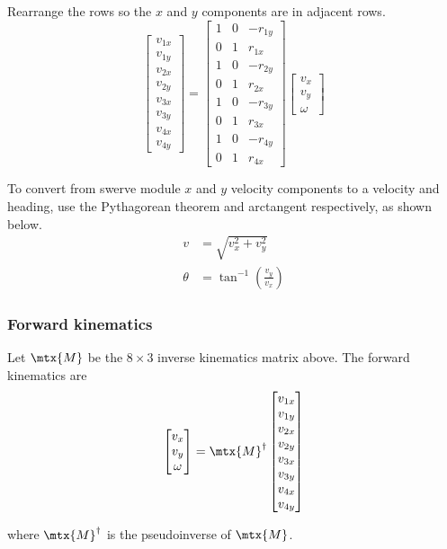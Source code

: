 Rearrange the rows so the $x$ and $y$ components are in adjacent rows.
\begin{equation}
  \begin{bmatrix}
    v_{1x} \\
    v_{1y} \\
    v_{2x} \\
    v_{2y} \\
    v_{3x} \\
    v_{3y} \\
    v_{4x} \\
    v_{4y}
  \end{bmatrix} =
  \begin{bmatrix}
    1 & 0 & -r_{1y} \\
    0 & 1 &  r_{1x} \\
    1 & 0 & -r_{2y} \\
    0 & 1 &  r_{2x} \\
    1 & 0 & -r_{3y} \\
    0 & 1 &  r_{3x} \\
    1 & 0 & -r_{4y} \\
    0 & 1 &  r_{4x}
  \end{bmatrix}
  \begin{bmatrix}
    v_x \\
    v_y \\
    \omega
  \end{bmatrix}
\end{equation}

To convert from swerve module $x$ and $y$ velocity components to a velocity and
heading, use the Pythagorean theorem and arctangent respectively, as shown
below.
\begin{align}
  v &= \sqrt{v_x^2 + v_y^2} \\
  \theta &= \tan^{-1}\left(\frac{v_y}{v_x}\right)
\end{align}

\subsubsection{Forward kinematics}

Let $\mtx{M}$ be the $8 \times 3$ inverse kinematics matrix above. The forward
kinematics are
\begin{equation}
  \begin{bmatrix}
    v_x \\
    v_y \\
    \omega
  \end{bmatrix} =
  \mtx{M}^\dagger
  \begin{bmatrix}
    v_{1x} \\
    v_{1y} \\
    v_{2x} \\
    v_{2y} \\
    v_{3x} \\
    v_{3y} \\
    v_{4x} \\
    v_{4y}
  \end{bmatrix}
\end{equation}

where $\mtx{M}^\dagger$ is the pseudoinverse of $\mtx{M}$.
